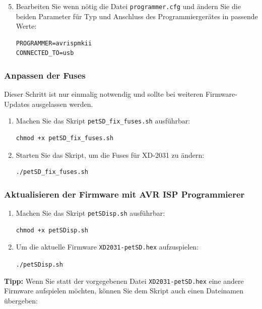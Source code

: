 \documentclass[10pt,a4paper]{scrartcl}		%
\begin{document}
\begin{enumerate}
\setcounter{enumi}{4}
\item Bearbeiten Sie wenn nötig die Datei \texttt{programmer.cfg} 
und ändern Sie die beiden Parameter für Typ und Anschluss des 
Programmiergerätes in pas\-sende Werte:
\begin{verbatim}
PROGRAMMER=avrispmkii
CONNECTED_TO=usb
\end{verbatim}
\end{enumerate}

\subsubsection*{Anpassen der Fuses}
Dieser Schritt ist nur einmalig notwendig und sollte bei
weiteren Firmware-Updates ausgelassen werden.
\begin{enumerate}
\item Machen Sie das Skript \texttt{petSD\_fix\_fuses.sh} ausführbar:
\begin{verbatim}
chmod +x petSD_fix_fuses.sh
\end{verbatim}

\item Starten Sie das Skript, um die Fuses für XD-2031 zu ändern:
\begin{verbatim}
./petSD_fix_fuses.sh
\end{verbatim}

\end{enumerate}

\subsubsection*{Aktualisieren der Firmware mit AVR ISP Programmierer}

\begin{enumerate}
\item Machen Sie das Skript \texttt{petSDisp.sh} ausführbar:
\begin{verbatim}
chmod +x petSDisp.sh
\end{verbatim}

\item Um die aktuelle Firmware \texttt{XD2031-petSD.hex} aufzuspielen:

\texttt{./petSDisp.sh}
\end{enumerate}

\textbf{Tipp:} Wenn Sie statt der vorgegebenen Datei 
\texttt{XD2031-petSD.hex}
eine andere Firmware aufspielen möchten, können Sie
dem Skript auch einen Dateinamen übergeben:
\end{document}
